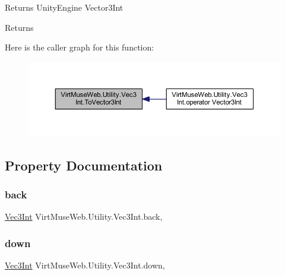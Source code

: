 Returns Unity\+Engine Vector3\+Int 

\begin{DoxyReturn}{Returns}

\end{DoxyReturn}
Here is the caller graph for this function\+:
\nopagebreak
\begin{figure}[H]
\begin{center}
\leavevmode
\includegraphics[width=350pt]{class_virt_muse_web_1_1_utility_1_1_vec3_int_a826b51cbef73c8623c7e060d3ae9c7f8_icgraph}
\end{center}
\end{figure}


\subsection{Property Documentation}
\mbox{\label{class_virt_muse_web_1_1_utility_1_1_vec3_int_adf508cd36d69991146611df3a1bacbe5}} 
\subsubsection{\texorpdfstring{back}{back}}
{\footnotesize\ttfamily \mbox{\hyperlink{class_virt_muse_web_1_1_utility_1_1_vec3_int}{Vec3\+Int}} Virt\+Muse\+Web.\+Utility.\+Vec3\+Int.\+back\hspace{0.3cm}{\ttfamily [static]}, {\ttfamily [get]}}

\mbox{\label{class_virt_muse_web_1_1_utility_1_1_vec3_int_a243ba7fd5823c5fa2a4265005279382b}} 
\subsubsection{\texorpdfstring{down}{down}}
{\footnotesize\ttfamily \mbox{\hyperlink{class_virt_muse_web_1_1_utility_1_1_vec3_int}{Vec3\+Int}} Virt\+Muse\+Web.\+Utility.\+Vec3\+Int.\+down\hspace{0.3cm}{\ttfamily [static]}, {\ttfamily [get]}}

